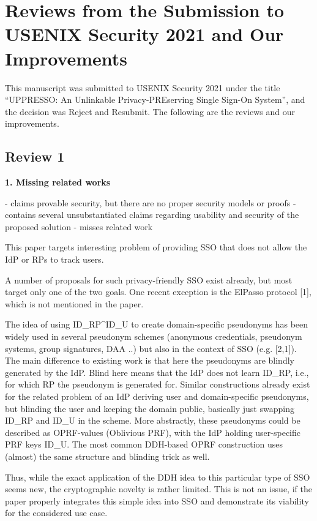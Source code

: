 \documentclass[letterpaper,onecolumn,10pt]{article}
\begin{document}
\section*{Reviews from the Submission to USENIX Security 2021 and Our Improvements}

This manuscript was submitted to USENIX Security 2021 under the title ``UPPRESSO: An Unlinkable Privacy-PREserving Single Sign-On System'',
     and the decision was Reject and Resubmit.
The following are the reviews and our improvements.

\subsection*{Review 1}
\noindent\textbf{1. Missing related works}

- claims provable security, but there are no proper security models or proofs
- contains several unsubstantiated claims regarding usability and security of the proposed solution
- misses related work

This paper targets interesting problem of providing SSO that does not allow the IdP or RPs to track users.

A number of proposals for such privacy-friendly SSO exist already, but most target only one of the two goals. One recent exception is the ElPasso protocol [1], which is not mentioned in the paper.


The idea of using ID_RP^ID_U to create domain-specific pseudonyms has been widely used in several pseudonym schemes (anonymous credentials, pseudonym systems, group signatures, DAA ..) but also in the context of SSO (e.g. [2,1]). The main difference to existing work is that here the pseudonyms are blindly generated by the IdP. Blind here means that the IdP does not learn ID_RP, i.e., for which RP the pseudonym is generated for. Similar constructions already exist for the related problem of an IdP deriving user and domain-specific pseudonyms, but blinding the user and keeping the domain public, basically just swapping ID_RP and ID_U in the scheme. More abstractly, these pseudonyms could be described as OPRF-values (Oblivious PRF), with the IdP holding user-specific PRF keys ID_U. The most common DDH-based OPRF construction uses (almost) the same structure and blinding trick as well.

Thus, while the exact application of the DDH idea to this particular type of SSO seems new, the cryptographic novelty is rather limited. This is not an issue, if the paper properly integrates this simple idea into SSO and demonstrate its viability for the considered use case.
\end{document}
